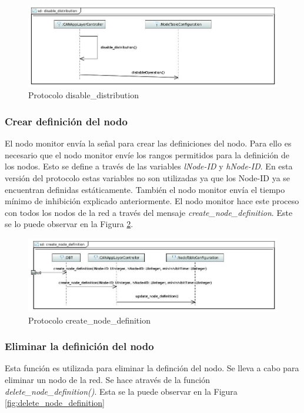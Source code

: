 \begin{figure}[h!]
 \centering
 \includegraphics[scale=0.4]{images/Secciones/AppendixA/disable_distribution.JPG}
  \caption{Protocolo disable\_distribution}
\label{fig:disable_distribution}
\end{figure}


\subsubsection{Crear definición del nodo}
El nodo monitor envía la señal para crear las definiciones del nodo. Para
ello es necesario que el nodo monitor envíe los rangos permitidos para la
definición de los nodos. Esto se define a través de las variables
\textit{lNode-ID} y \textit{hNode-ID}. En esta versión del protocolo estas
variables no son utilizadas ya que los Node-ID ya se encuentran definidas
estáticamente. También el nodo monitor envía el tiempo mínimo de inhibición
explicado anteriormente. El nodo monitor hace este proceso con todos los nodos
de la red a través del mensaje \textit{create\_node\_definition}. Este se lo
puede observar en la Figura \ref{fig:create_node_definition}.

\begin{figure}[h!]
 \centering
 \includegraphics[scale=0.4]{images/Secciones/AppendixA/create_node_definition.JPG}
  \caption{Protocolo create\_node\_definition}
\label{fig:create_node_definition}
\end{figure}


\subsubsection{Eliminar la definición del nodo}
Esta función es utilizada para eliminar la definción del nodo. Se lleva a cabo
para eliminar un nodo de la red. Se hace através de la función
\textit{delete\_node\_definition()}. Esta se la puede observar en la Figura
\ref{fig:delete_node_definition}

